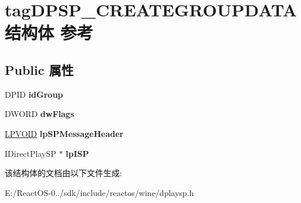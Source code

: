 \hypertarget{structtag_d_p_s_p___c_r_e_a_t_e_g_r_o_u_p_d_a_t_a}{}\section{tag\+D\+P\+S\+P\+\_\+\+C\+R\+E\+A\+T\+E\+G\+R\+O\+U\+P\+D\+A\+T\+A结构体 参考}
\label{structtag_d_p_s_p___c_r_e_a_t_e_g_r_o_u_p_d_a_t_a}
\subsection*{Public 属性}
\begin{DoxyCompactItemize}
\item 
\mbox{\label{structtag_d_p_s_p___c_r_e_a_t_e_g_r_o_u_p_d_a_t_a_af50b0ce5b64f9d379ae6cf3d2de8ca99}} 
D\+P\+ID {\bfseries id\+Group}
\item 
\mbox{\label{structtag_d_p_s_p___c_r_e_a_t_e_g_r_o_u_p_d_a_t_a_ae52a55a4174c2497cad378c7d0bec257}} 
D\+W\+O\+RD {\bfseries dw\+Flags}
\item 
\mbox{\label{structtag_d_p_s_p___c_r_e_a_t_e_g_r_o_u_p_d_a_t_a_a89571945a8eccc8fd3f0f963b63baebf}} 
\hyperlink{interfacevoid}{L\+P\+V\+O\+ID} {\bfseries lp\+S\+P\+Message\+Header}
\item 
\mbox{\label{structtag_d_p_s_p___c_r_e_a_t_e_g_r_o_u_p_d_a_t_a_a6f3bff522da014990ebef443bbc5684c}} 
I\+Direct\+Play\+SP $\ast$ {\bfseries lp\+I\+SP}
\end{DoxyCompactItemize}


该结构体的文档由以下文件生成\+:\begin{DoxyCompactItemize}
\item 
E\+:/\+React\+O\+S-\/0../sdk/include/reactos/wine/dplaysp.\+h\end{DoxyCompactItemize}
